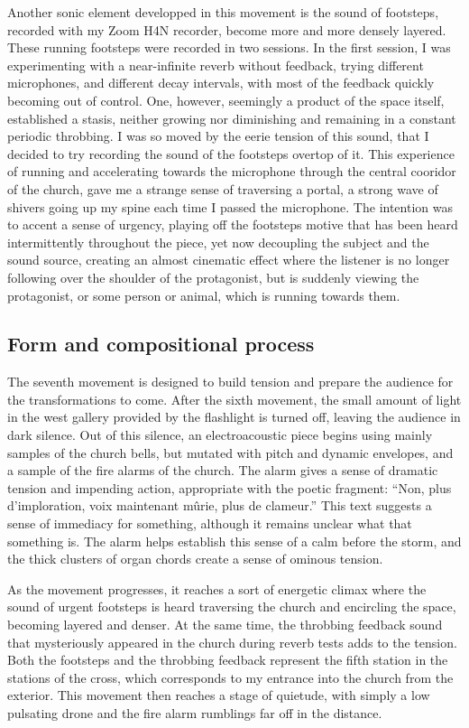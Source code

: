 \documentclass[12pt,twoside,maitrise]{dms_ks}
\theoremstyle{definition}
\begin{document}
Another sonic element developped in this movement is the sound of footsteps, recorded with my Zoom H4N recorder, become more and more densely layered. 
These running footsteps were recorded in two sessions. 
In the first session, I was experimenting with a near-infinite reverb without feedback, trying different microphones, and different decay intervals, with most of the feedback quickly becoming out of control. 
One, however, seemingly a product of the space itself, established a stasis, neither growing nor diminishing and remaining in a constant periodic throbbing. 
I was so moved by the eerie tension of this sound, that I decided to try recording the sound of the footsteps overtop of it. 
This experience of running and accelerating towards the microphone through the central cooridor of the church, gave me a strange sense of traversing a portal, a strong wave of shivers going up my spine each time I passed the microphone.
The intention was to accent a sense of urgency, playing off the footsteps motive that has been heard intermittently throughout the piece, yet now decoupling the subject and the sound source, creating an almost cinematic effect where the listener is no longer following over the shoulder of the protagonist, but is suddenly viewing the protagonist, or some person or animal, which is running towards them. 

\subsection{Form and compositional process}

The seventh movement is designed to build tension and prepare the audience for the transformations to come. 
After the sixth movement, the small amount of light in the west gallery provided by the flashlight is turned off, leaving the audience in dark silence. 
Out of this silence, an electroacoustic piece begins using mainly samples of the church bells, but mutated with pitch and dynamic envelopes, and a sample of the fire alarms of the church. 
The alarm gives a sense of dramatic tension and impending action, appropriate with the poetic fragment: “Non, plus d’imploration, voix maintenant mûrie, plus de clameur.” This text suggests a sense of immediacy for something, although it remains unclear what that something is. 
The alarm helps establish this sense of a calm before the storm, and the thick clusters of organ chords create a sense of ominous tension.

As the movement progresses, it reaches a sort of energetic climax where the sound of urgent footsteps is heard traversing the church and encircling the space, becoming layered and denser. 
At the same time, the throbbing feedback sound that mysteriously appeared in the church during reverb tests adds to the tension. 
Both the footsteps and the throbbing feedback represent the fifth station in the stations of the cross, which corresponds to my entrance into the church from the exterior. 
This movement then reaches a stage of quietude, with simply a low pulsating drone and the fire alarm rumblings far off in the distance.
\end{document}
